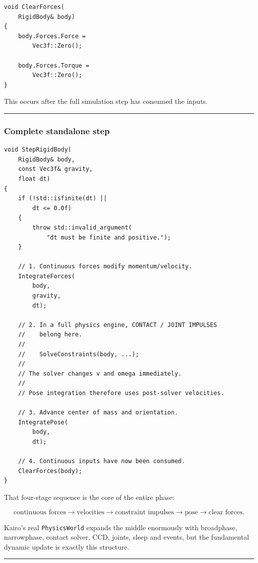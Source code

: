\begin{verbatim}
void ClearForces(
    RigidBody& body)
{
    body.Forces.Force =
        Vec3f::Zero();

    body.Forces.Torque =
        Vec3f::Zero();
}
\end{verbatim}

This occurs after the full simulation step has consumed the inputs.

\begin{center}\rule{0.5\linewidth}{0.5pt}\end{center}

\subsubsection{Complete standalone step}\label{complete-standalone-step}

\begin{verbatim}
void StepRigidBody(
    RigidBody& body,
    const Vec3f& gravity,
    float dt)
{
    if (!std::isfinite(dt) ||
        dt <= 0.0f)
    {
        throw std::invalid_argument(
            "dt must be finite and positive.");
    }

    // 1. Continuous forces modify momentum/velocity.
    IntegrateForces(
        body,
        gravity,
        dt);

    // 2. In a full physics engine, CONTACT / JOINT IMPULSES
    //    belong here.
    //
    //    SolveConstraints(body, ...);
    //
    // The solver changes v and omega immediately.
    //
    // Pose integration therefore uses post-solver velocities.

    // 3. Advance center of mass and orientation.
    IntegratePose(
        body,
        dt);

    // 4. Continuous inputs have now been consumed.
    ClearForces(body);
}
\end{verbatim}

That four-stage sequence is the core of the entire phase:

\[
\boxed{
\text{continuous forces}
\rightarrow
\text{velocities}
\rightarrow
\text{constraint impulses}
\rightarrow
\text{pose}
\rightarrow
\text{clear forces}.
}
\]

Kairo's real \texttt{PhysicsWorld} expands the middle enormously with broadphase, narrowphase, contact solver, CCD, joints, sleep and events, but the fundamental dynamic update is exactly this structure.

\begin{center}\rule{0.5\linewidth}{0.5pt}\end{center}

